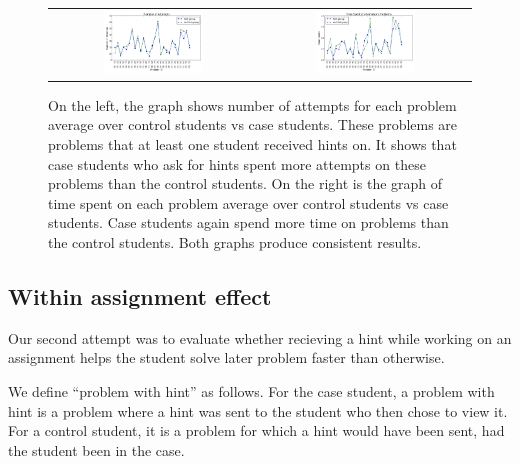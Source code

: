 \documentclass{llncs}
\begin{document}
\fi
\begin{figure}[ht]
\centering
   \begin{tabular}{c c}
		\includegraphics[width=0.5\textwidth]{image/new_tries_analysis.png} &
		\includegraphics[width=0.5\textwidth]{image/new_times_analysis.png}
	\end{tabular}
\caption{On the left, the graph shows number of attempts for each problem average over control students vs case students. These problems are problems that at least one student received hints on. It shows that case students who ask for hints spent more attempts on these problems than the control students. On the right is the graph of time spent on each problem average over control students vs case students. Case students again spend more time on problems than the control students. Both graphs produce consistent results.}
    \label{fig:tries_times_analysis}
\end{figure}

\subsection{Within assignment effect}

Our second attempt was to evaluate whether recieving a hint while
working on an assignment helps the student solve later problem faster
than otherwise.

We define ``problem with hint'' as follows. For the case student, a
problem with hint is a problem where a hint was sent to the student
who then chose to view it. For a control student, it is a problem for
which a hint would have been sent, had the student been in the case.
\end{document}
